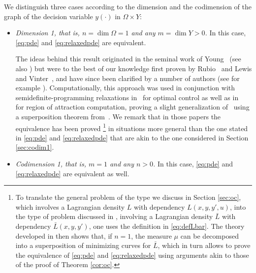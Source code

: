 \documentclass{article}
\theoremstyle{definition}
\theoremstyle{remark}
\begin{document}
We distinguish three cases according to the dimension and the codimension of the graph of the decision variable $y(\cdot)$ in $\Omega\times Y$:
\begin{itemize}
 \item \emph{Dimension 1, that is, $n=\dim \Omega=1$ and any $m=\dim Y>0$.} In this case, \eqref{eq:pde} and \eqref{eq:relaxedpde} are equivalent. 
 
 The ideas behind this result originated in the seminal work of Young~\cite{young_lectures} (see also \cite{patrick}) but were to the best of our knowledge first proven by Rubio~\cite{rubio1975generalized,rubio1976extremal} and Lewis and Vinter~\cite{vinter1978equivalence,lewis1980relaxation}, and have since been clarified by a number of authors (see for example \cite{bernard2008young}). Computationally, this approach was used in conjunction with semidefinite-programming relaxations in~\cite{lasserre2008nonlinear} for optimal control as well as in~\cite{kordaROA} for region of attraction computation, proving a slight generalization of~\cite{vinter1978equivalence} using a superposition theorem from~\cite{ambrosio2008transport}. We remark that in those papers the equivalence has been proved%
 \footnote{
 To translate the general problem of the type we discuss in Section \ref{sec:oc}, which involves a Lagrangian density $L$ with dependency $L(x,y,y',u)$, into the type of problem discussed in \cite{bernard2008young}, involving a Lagrangian density $\bar L$  with dependency $\bar L(x,y,y')$,  one uses the definition in \eqref{eq:defLbar}. The theory developed in \cite[\S5]{bernard2008young} then shows that, if $n=1$, the measure $\mu$ can be decomposed into a superposition of minimizing curves for $\bar L$, which in turn allows to prove the equivalence of \eqref{eq:pde} and \eqref{eq:relaxedpde} using arguments akin to those of the proof of Theorem \ref{cor:oc}.
 } in situations more general
 than the one stated in \eqref{eq:pde} and \eqref{eq:relaxedpde} that are akin to the one considered in Section \ref{sec:codim1}.

 
 
 \item \emph{Codimension 1, that is, $m=1$ and any $n>0$.} In this case, \eqref{eq:pde} and \eqref{eq:relaxedpde} are equivalent as well. 
 

\end{itemize}
\end{document}
